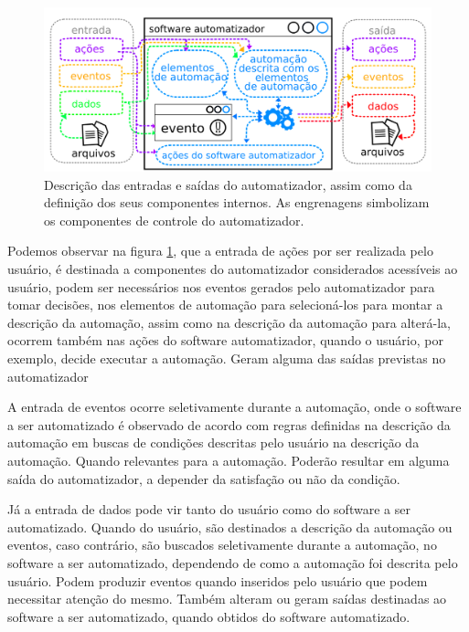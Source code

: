 \documentclass[tg]{mdtufsm}
\begin{document}
                \begin{figure}[!htb]
                    {\centering
                    \includegraphics[width=1.0\textwidth]{imagens/automatIO}
                    \caption{Descrição das entradas e saídas do automatizador, assim como da definição dos seus componentes internos. As engrenagens simbolizam os componentes de controle do automatizador.}
                    \label{fig:automatIO}}
                \end{figure}

                Podemos observar na figura \ref{fig:automatIO}, que a entrada de ações por ser realizada pelo usuário, é destinada a componentes do automatizador considerados acessíveis ao usuário, podem ser necessários nos eventos gerados pelo automatizador para tomar decisões, nos elementos de automação para selecioná-los para montar a descrição da automação, assim como na descrição da automação para alterá-la, ocorrem também nas ações do software automatizador, quando o usuário, por exemplo, decide executar a automação. Geram alguma das saídas previstas no automatizador

                A entrada de eventos ocorre seletivamente durante a automação, onde o software a ser automatizado é observado de acordo com regras definidas na descrição da automação em buscas de condições descritas pelo usuário na descrição da automação. Quando relevantes para a automação. Poderão resultar em alguma saída do automatizador, a depender da satisfação ou não da condição.

                Já a entrada de dados pode vir tanto do usuário como do software a ser automatizado. Quando do usuário, são destinados a descrição da automação ou eventos, caso contrário, são buscados seletivamente durante a automação, no software a ser automatizado, dependendo de como a automação foi descrita pelo usuário. Podem produzir eventos quando inseridos pelo usuário que podem necessitar atenção do mesmo. Também alteram ou geram saídas destinadas ao software a ser automatizado, quando obtidos do software automatizado.
\end{document}
